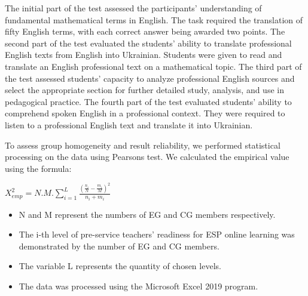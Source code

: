 The initial part of the test assessed the participants' understanding of
fundamental mathematical terms in English. The task required the
translation of fifty English terms, with each correct answer being
awarded two points. The second part of the test evaluated the students'
ability to translate professional English texts from English into
Ukrainian. Students were given to read and translate an English
professional text on a mathematical topic. The third part of the test
assessed students' capacity to analyze professional English sources and
select the appropriate section for further detailed study, analysis, and
use in pedagogical practice. The fourth part of the test evaluated
students' ability to comprehend spoken English in a professional
context. They were required to listen to a professional English text and
translate it into Ukrainian.

To assess group homogeneity and result reliability, we performed
statistical processing on the data using Pearson\textquotesingle s test.
We calculated the empirical value using the formula:

\vspace{2pt}
 
 
{\begin{center}
\large$X^{2}_{emp} = N . M . \sum_{i=1}^{L}\frac{ (\frac{n_{i}}{N}-\frac{m_{i}}{M})^{2}}{n_{i}+m_{i}} \label{formula-01}$
\end{center}}


\vspace{2pt}

\begin{itemize}
    \item N and M represent the numbers of EG and CG members respectively.
    \item The i-th level of pre-service teachers' readiness for ESP online
learning was demonstrated by the number of EG and CG members.
    \item The variable L represents the quantity of chosen levels. 
    \item The data was processed using the Microsoft Excel 2019 program.
\end{itemize}
